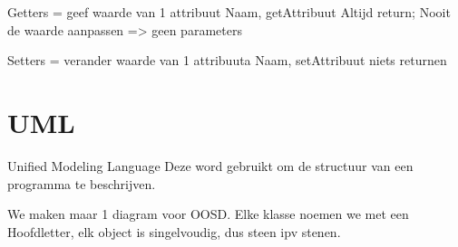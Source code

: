 \documentclass{article}
\begin{document}
Getters = geef waarde van 1 attribuut
Naam, getAttribuut
Altijd return;
Nooit de waarde aanpassen => geen parameters

Setters = verander waarde van 1 attribuuta
Naam, setAttribuut
niets returnen

\section{UML}
Unified Modeling Language
Deze word gebruikt om de structuur van een programma te beschrijven.	

We maken maar 1 diagram voor OOSD. 
Elke klasse noemen we met een Hoofdletter, elk object is singelvoudig, dus steen ipv stenen.
\end{document}
